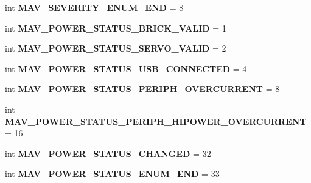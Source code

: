 \begin{DoxyCompactItemize}
int {\bfseries M\+A\+V\+\_\+\+S\+E\+V\+E\+R\+I\+T\+Y\+\_\+\+E\+N\+U\+M\+\_\+\+E\+ND} = 8
\item 
\mbox{\label{namespacepymavlink_1_1dialects_1_1v10_a912c5877dbeaa3dfdd47ad3f3bd2898e}} 
int {\bfseries M\+A\+V\+\_\+\+P\+O\+W\+E\+R\+\_\+\+S\+T\+A\+T\+U\+S\+\_\+\+B\+R\+I\+C\+K\+\_\+\+V\+A\+L\+ID} = 1
\item 
\mbox{\label{namespacepymavlink_1_1dialects_1_1v10_a7a01382080310257f99994409ee547c5}} 
int {\bfseries M\+A\+V\+\_\+\+P\+O\+W\+E\+R\+\_\+\+S\+T\+A\+T\+U\+S\+\_\+\+S\+E\+R\+V\+O\+\_\+\+V\+A\+L\+ID} = 2
\item 
\mbox{\label{namespacepymavlink_1_1dialects_1_1v10_a9801955745e7cabd81e295a7799c9948}} 
int {\bfseries M\+A\+V\+\_\+\+P\+O\+W\+E\+R\+\_\+\+S\+T\+A\+T\+U\+S\+\_\+\+U\+S\+B\+\_\+\+C\+O\+N\+N\+E\+C\+T\+ED} = 4
\item 
\mbox{\label{namespacepymavlink_1_1dialects_1_1v10_a7c8947d77c5c61d8fb779254e078a419}} 
int {\bfseries M\+A\+V\+\_\+\+P\+O\+W\+E\+R\+\_\+\+S\+T\+A\+T\+U\+S\+\_\+\+P\+E\+R\+I\+P\+H\+\_\+\+O\+V\+E\+R\+C\+U\+R\+R\+E\+NT} = 8
\item 
\mbox{\label{namespacepymavlink_1_1dialects_1_1v10_a49b575d7ed58e73522216dff7011d091}} 
int {\bfseries M\+A\+V\+\_\+\+P\+O\+W\+E\+R\+\_\+\+S\+T\+A\+T\+U\+S\+\_\+\+P\+E\+R\+I\+P\+H\+\_\+\+H\+I\+P\+O\+W\+E\+R\+\_\+\+O\+V\+E\+R\+C\+U\+R\+R\+E\+NT} = 16
\item 
\mbox{\label{namespacepymavlink_1_1dialects_1_1v10_a3eefeb4a46b064967477a46f0e3b5df1}} 
int {\bfseries M\+A\+V\+\_\+\+P\+O\+W\+E\+R\+\_\+\+S\+T\+A\+T\+U\+S\+\_\+\+C\+H\+A\+N\+G\+ED} = 32
\item 
\mbox{\label{namespacepymavlink_1_1dialects_1_1v10_a40eb9e9a9f18f143650729a766ad6d5c}} 
int {\bfseries M\+A\+V\+\_\+\+P\+O\+W\+E\+R\+\_\+\+S\+T\+A\+T\+U\+S\+\_\+\+E\+N\+U\+M\+\_\+\+E\+ND} = 33
\item 
\mbox{\label{namespacepymavlink_1_1dialects_1_1v10_a675a28e4efbb07d956b74e4958bb61c6}} 

\end{DoxyCompactItemize}

